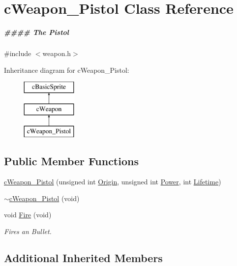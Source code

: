 \hypertarget{classc_weapon___pistol}{\section{c\-Weapon\-\_\-\-Pistol Class Reference}
\label{classc_weapon___pistol}
}


\subparagraph*{\#\#\#\# The Pistol} 




{\ttfamily \#include $<$weapon.\-h$>$}

Inheritance diagram for c\-Weapon\-\_\-\-Pistol\-:\begin{figure}[H]
\begin{center}
\leavevmode
\includegraphics[height=3.000000cm]{classc_weapon___pistol}
\end{center}
\end{figure}
\subsection*{Public Member Functions}
\begin{DoxyCompactItemize}
\item 
\hyperlink{classc_weapon___pistol_a43bca4ee29db52bc801227deb9d174f1}{c\-Weapon\-\_\-\-Pistol} (unsigned int \hyperlink{classc_weapon_a2a521dd1a2aa10d5f6c0b45c09932519}{Origin}, unsigned int \hyperlink{classc_weapon_aa33960894f9ca703e3b3ad6a9f7f3f67}{Power}, int \hyperlink{classc_weapon_a7bc9a58e30a80556ba83e32067657b74}{Lifetime})
\item 
\hyperlink{classc_weapon___pistol_a88f39c7acfa314d2719d4f7fd7a00e75}{$\sim$c\-Weapon\-\_\-\-Pistol} (void)
\item 
void \hyperlink{classc_weapon___pistol_a721295c1a1e841a80fe8b24c30809ad3}{Fire} (void)
\begin{DoxyCompactList}\small\item\em Fires an Bullet. \end{DoxyCompactList}\end{DoxyCompactItemize}
\subsection*{Additional Inherited Members}


